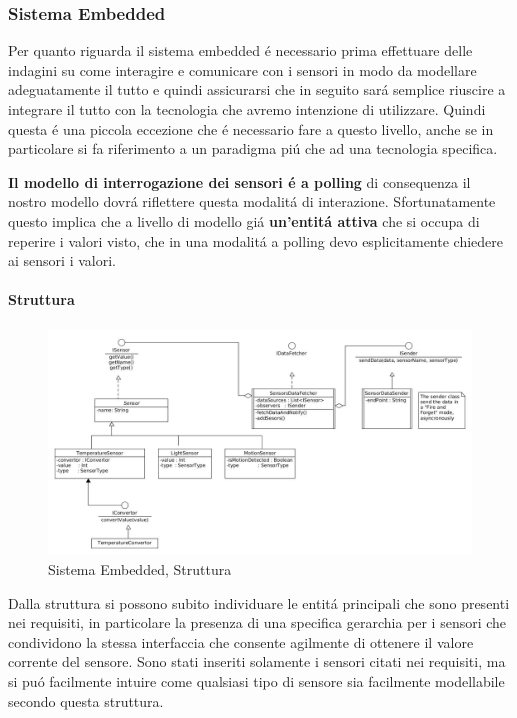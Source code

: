 \subsubsection{Sistema Embedded}

Per quanto riguarda il sistema embedded \'e necessario prima effettuare delle indagini su come interagire e comunicare con i sensori in modo da modellare adeguatamente il tutto e quindi assicurarsi che in seguito sar\'a semplice riuscire a integrare il tutto con la tecnologia che avremo intenzione di utilizzare. Quindi questa \'e una piccola eccezione che \'e necessario fare a questo livello, anche se in particolare si fa riferimento a un paradigma pi\'u che ad una tecnologia specifica.

\textbf{Il modello di interrogazione dei sensori \'e a polling} di consequenza il nostro modello dovr\'a riflettere questa modalit\'a di interazione. Sfortunatamente questo implica che a livello di modello gi\'a \textbf{un'entit\'a attiva} che si occupa di reperire i valori visto, che in una modalit\'a a polling devo esplicitamente chiedere ai sensori i valori.

\paragraph{Struttura}

\begin{figure}[ht]
\centering
\includegraphics[width=\textwidth]{Figures/DomainModel/EmbeddedSystem/Structure.jpg}
\caption{Sistema Embedded, Struttura}
\end{figure}

Dalla struttura si possono subito individuare le entit\'a principali che sono presenti nei requisiti, in particolare la presenza di una specifica gerarchia per i sensori che condividono la stessa interfaccia che consente agilmente di ottenere il valore corrente del sensore. Sono stati inseriti solamente i sensori citati nei requisiti, ma si pu\'o facilmente intuire come qualsiasi tipo di sensore sia facilmente modellabile secondo questa struttura.

